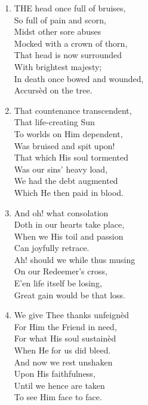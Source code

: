 \documentclass[11pt,a4paper]{article}
\begin{document}
\begin{enumerate}
    \item THE head once full of bruises, \\
        So full of pain and scorn, \\
        Midst other sore abuses \\
        Mocked with a crown of thorn, \\
        That head is now surrounded \\
        With brightest majesty; \\
        In death once bowed and wounded, \\
        Accurs\`ed on the tree.

    \item That countenance transcendent, \\
        That life-creating Sun \\
        To worlds on Him dependent, \\
        Was bruised and spit upon! \\
        That which His soul tormented \\
        Was our sins' heavy load, \\
        We had the debt augmented \\
        Which He then paid in blood.

    \item And oh! what consolation \\
        Doth in our hearts take place, \\
        When we His toil and passion \\
        Can joyfully retrace. \\
        Ah! should we while thus musing \\
        On our Redeemer's cross, \\
        E'en life itself be losing, \\
        Great gain would be that loss.

    \item We give Thee thanks unfeign\`ed \\
        For Him the Friend in need, \\
        For what His soul sustain\`ed \\
        When He for us did bleed. \\
        And now we rest unshaken \\
        Upon His faithfulness, \\
        Until we hence are taken \\
        To see Him face to face.

\end{enumerate}
\end{document}
